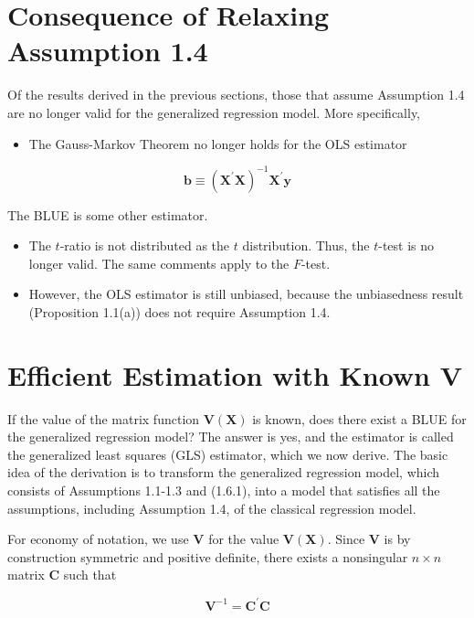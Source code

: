 \documentclass[10pt]{article}
\begin{document}
\section*{Consequence of Relaxing Assumption 1.4}
Of the results derived in the previous sections, those that assume Assumption 1.4 are no longer valid for the generalized regression model. More specifically,

\begin{itemize}
  \item The Gauss-Markov Theorem no longer holds for the OLS estimator
\end{itemize}

$$
\mathbf{b} \equiv\left(\mathbf{X}^{\prime} \mathbf{X}\right)^{-1} \mathbf{X}^{\prime} \mathbf{y}
$$

The BLUE is some other estimator.

\begin{itemize}
  \item The $t$-ratio is not distributed as the $t$ distribution. Thus, the $t$-test is no longer valid. The same comments apply to the $F$-test.
  \item However, the OLS estimator is still unbiased, because the unbiasedness result (Proposition 1.1(a)) does not require Assumption 1.4.
\end{itemize}

\section*{Efficient Estimation with Known V}
If the value of the matrix function $\mathbf{V}(\mathbf{X})$ is known, does there exist a BLUE for the generalized regression model? The answer is yes, and the estimator is called the generalized least squares (GLS) estimator, which we now derive. The basic idea of the derivation is to transform the generalized regression model, which consists of Assumptions 1.1-1.3 and (1.6.1), into a model that satisfies all the assumptions, including Assumption 1.4, of the classical regression model.

For economy of notation, we use $\mathbf{V}$ for the value $\mathbf{V}(\mathbf{X})$. Since $\mathbf{V}$ is by construction symmetric and positive definite, there exists a nonsingular $n \times n$ matrix $\mathbf{C}$ such that


\begin{equation*}
\mathbf{V}^{-1}=\mathbf{C}^{\prime} \mathbf{C} \tag{1.6.2}
\end{equation*}
\end{document}
